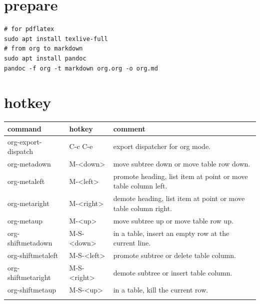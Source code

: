 \documentclass[11pt]{article}
\author{jaloo}
\date{\today}
\title{}
\begin{document}
\tableofcontents

\section{prepare}
\label{sec:org33323c2}
\begin{verbatim}
# for pdflatex
sudo apt install texlive-full
# from org to markdown
sudo apt install pandoc
pandoc -f org -t markdown org.org -o org.md
\end{verbatim}
\section{hotkey}
\label{sec:org9c5ed1f}
\begin{center}
\begin{tabular}{lll}
command & hotkey & comment\\
\hline
org-export-dispatch & C-c C-e & export dispatcher for org mode.\\
org-metadown & M-<down> & move subtree down or move table row down.\\
org-metaleft & M-<left> & promote heading, list item at point or move table column left.\\
org-metaright & M-<right> & demote heading, list item at point or move table column right.\\
org-metaup & M-<up> & move subtree up or move table row up.\\
org-shiftmetadown & M-S-<down> & in a table, insert an empty row at the current line.\\
org-shiftmetaleft & M-S-<left> & promote subtree or delete table column.\\
org-shiftmetaright & M-S-<right> & demote subtree or insert table column.\\
org-shiftmetaup & M-S-<up> & in a table, kill the current row.\\
 &  & \\
\end{tabular}
\end{center}
\end{document}
